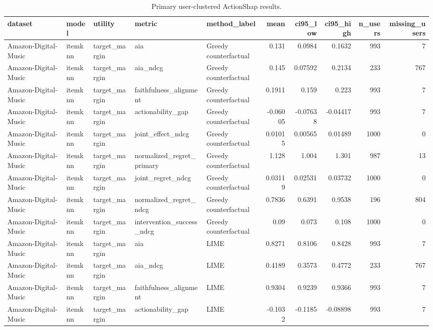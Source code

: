 \begin{table}[t]\centering
\caption{Primary user-clustered ActionShap results.}\label{tab:primary-results}
\begin{tabular}{lllllrrrrr}
\toprule
dataset & model & utility & metric & method\_label & mean & ci95\_low & ci95\_high & n\_users & missing\_users \\
\midrule
Amazon-Digital-Music & itemknn & target\_margin & aia & Greedy counterfactual & 0.131 & 0.0984 & 0.1632 & 993 & 7 \\
Amazon-Digital-Music & itemknn & target\_margin & aia\_ndcg & Greedy counterfactual & 0.145 & 0.07592 & 0.2134 & 233 & 767 \\
Amazon-Digital-Music & itemknn & target\_margin & faithfulness\_alignment & Greedy counterfactual & 0.1911 & 0.159 & 0.223 & 993 & 7 \\
Amazon-Digital-Music & itemknn & target\_margin & actionability\_gap & Greedy counterfactual & -0.06005 & -0.07638 & -0.04417 & 993 & 7 \\
Amazon-Digital-Music & itemknn & target\_margin & joint\_effect\_ndcg & Greedy counterfactual & 0.01015 & 0.00565 & 0.01489 & 1000 & 0 \\
Amazon-Digital-Music & itemknn & target\_margin & normalized\_regret\_primary & Greedy counterfactual & 1.128 & 1.004 & 1.301 & 987 & 13 \\
Amazon-Digital-Music & itemknn & target\_margin & joint\_regret\_ndcg & Greedy counterfactual & 0.03119 & 0.02531 & 0.03732 & 1000 & 0 \\
Amazon-Digital-Music & itemknn & target\_margin & normalized\_regret\_ndcg & Greedy counterfactual & 0.7836 & 0.6391 & 0.9538 & 196 & 804 \\
Amazon-Digital-Music & itemknn & target\_margin & intervention\_success\_ndcg & Greedy counterfactual & 0.09 & 0.073 & 0.108 & 1000 & 0 \\
Amazon-Digital-Music & itemknn & target\_margin & aia & LIME & 0.8271 & 0.8106 & 0.8428 & 993 & 7 \\
Amazon-Digital-Music & itemknn & target\_margin & aia\_ndcg & LIME & 0.4189 & 0.3573 & 0.4772 & 233 & 767 \\
Amazon-Digital-Music & itemknn & target\_margin & faithfulness\_alignment & LIME & 0.9304 & 0.9239 & 0.9366 & 993 & 7 \\
Amazon-Digital-Music & itemknn & target\_margin & actionability\_gap & LIME & -0.1032 & -0.1185 & -0.08898 & 993 & 7 \\

\end{tabular}
\end{table}
